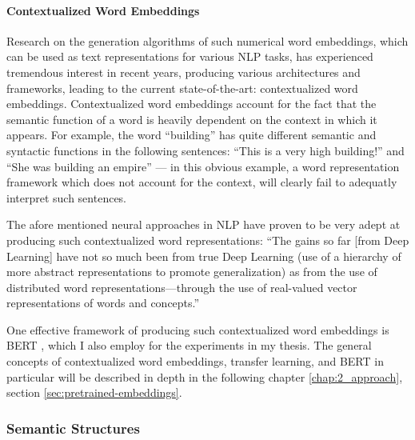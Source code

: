 \paragraph*{Contextualized Word Embeddings}

Research on the generation algorithms of such numerical word embeddings, which can
be used as text representations for various NLP tasks, has experienced tremendous
interest in recent years, producing various architectures and frameworks, leading
to the current state-of-the-art: contextualized word embeddings. Contextualized word embeddings
account for the fact that the semantic function of a word is heavily dependent on
the context in which it appears. For example, the word ``building'' has quite different semantic
and syntactic functions in the following sentences: ``This is a very high building!''
and ``She was building an empire'' --- in this obvious example, a word representation
framework which does not account for the context, will clearly fail to adequatly interpret
such sentences.

The afore mentioned neural approaches in NLP have proven to be very adept at
producing such contextualized word representations: ``The gains so far [from Deep Learning] have
not so much been from true Deep Learning (use of a hierarchy of more abstract
representations to promote generalization) as from the use of distributed word
representations—through the use of real-valued vector representations of words
and concepts.'' \citep[p.~703]{manning2015computational}


One effective framework of producing such contextualized word embeddings is
BERT \citep{devlin2018bert}, which I also employ for the experiments in my
thesis. The general concepts of contextualized word embeddings, transfer
learning, and BERT in particular will be described in depth in the following
chapter \ref{chap:2_approach}, section \ref{sec:pretrained-embeddings}.


\subsubsection*{Semantic Structures}

